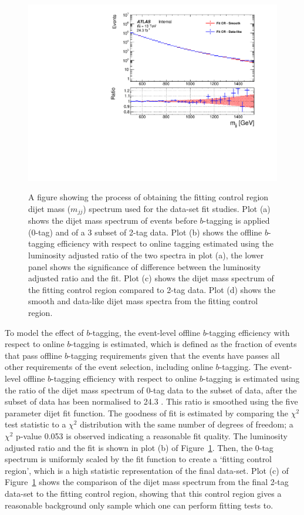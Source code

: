 \begin{figure}[!htb]
{  \includegraphics[width=0.51\linewidth, angle=0]{figs/Dibjet/LowMass/FitStudy/corrFitCR_smooth_dataLike.pdf}
}
\hspace{-2mm}
\vspace{10pt}
\caption{\label{fig:fittingCR}
  A figure showing the process of obtaining the fitting control region dijet mass ($m_{jj}$) spectrum
  used for the \lm{} data-set fit studies.
  Plot (a) shows the dijet mass spectrum of events before $b$-tagging is applied (0-tag) and of a 3 \ifb{} subset of 2-tag data.
  Plot (b) shows the offline $b$-tagging efficiency with respect to online tagging estimated using the luminosity adjusted ratio of the two spectra in plot (a),
  the lower panel shows the significance of difference between the luminosity adjusted ratio and the fit.
  Plot (c) shows the dijet mass spectrum of the fitting control region compared to 2-tag data.
  Plot (d) shows the smooth and data-like dijet mass spectra from the fitting control region.
}
\end{figure}

To model the effect of $b$-tagging, the event-level offline $b$-tagging efficiency with respect to online $b$-tagging is estimated,
which is defined as the fraction of events that pass offline $b$-tagging requirements given
that the events have passes all other requirements of the \lm{} event selection, including online $b$-tagging.
The event-level offline $b$-tagging efficiency with respect to online $b$-tagging is estimated using the ratio
of the dijet mass spectrum of 0-tag data to the subset of data, after the subset of data has been normalised to 24.3 \ifb{}.
This ratio is smoothed using the five parameter dijet fit function.
The goodness of fit is estimated by comparing the $\chi^2$ test statistic to a $\chi^2$ distribution with the same number of degrees of freedom;
a $\chi^2$ p-value 0.053 is observed indicating a reasonable fit quality.
The luminosity adjusted ratio and the fit is shown in plot (b) of Figure~\ref{fig:fittingCR}.
Then, the 0-tag spectrum is uniformly scaled by the fit function to create a `fitting control region', which is a high statistic representation of the final data-set.
Plot (c) of Figure~\ref{fig:fittingCR} shows the comparison of the dijet mass spectrum from the final 2-tag data-set to the fitting control region,
showing that this control region gives a reasonable background only sample which one can perform fitting tests to.


